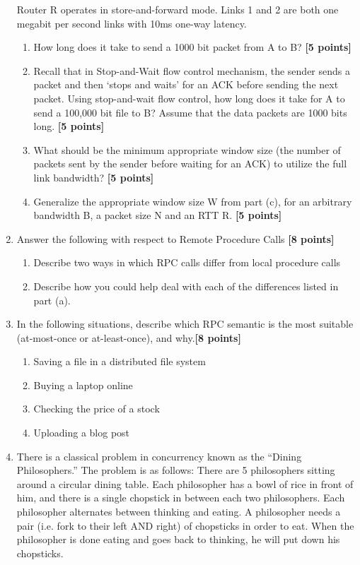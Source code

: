 \documentclass{article}
\begin{document}
\begin{enumerate}
Router R operates in store-and-forward mode. Links 1 and 2 are both one megabit per second links with 10ms one-way latency.

    \begin{enumerate}
    \item How long does it take to send a 1000 bit packet from A to B? \textbf{[5 points]}
    \item Recall that in Stop-and-Wait flow control mechanism, the sender sends a packet and then ‘stops and waits’ for an ACK before sending the next packet. Using stop-and-wait flow control, how long does it take for A to send a 100,000 bit file to B?  Assume that the data packets are 1000 bits long. \textbf{[5 points]}
    \item What should be the minimum appropriate window size (the number of packets sent by the sender before waiting for an ACK) to utilize the full link bandwidth? \textbf{[5 points]} 
    \item Generalize the appropriate window size W from part (c), for an arbitrary bandwidth B, a packet size N and an RTT R. \textbf{[5 points]}
    \end{enumerate}

\newpage
\item Answer the following with respect to Remote Procedure Calls \textbf{[8 points]}
    \begin{enumerate}
    \item Describe two ways in which RPC calls differ from local procedure calls
    
    \item Describe how you could help deal with each of the differences listed in part (a).
    \end{enumerate}
    
    
\item
In the following situations, describe which RPC semantic is the most suitable (at-most-once or at-least-once), and why.\textbf{[8 points]}
    \begin{enumerate}
    \item Saving a file in a distributed file system
    \item Buying a laptop online
    \item Checking the price of a stock
    \item Uploading a blog post

    \end{enumerate}

\item
There is a classical problem in concurrency known as the “Dining Philosophers.” The problem is as follows: There are 5 philosophers sitting around a circular dining table. Each philosopher has a bowl of rice in front of him, and there is a single chopstick in between each two philosophers. Each philosopher alternates between thinking and eating. A philosopher needs a pair (i.e. fork to their left AND right) of chopsticks in order to eat. When the philosopher is done eating and goes back to thinking, he will put down his chopsticks. 


\end{enumerate}
\end{document}
